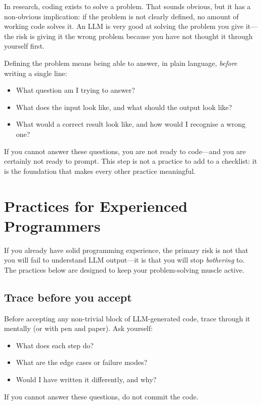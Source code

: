 \documentclass[12pt]{article}
\begin{document}
In research, coding exists to solve a problem. That sounds obvious, but it has a non-obvious implication: if the problem is not clearly defined, no amount of working code solves it. An LLM is very good at solving the problem you give it---the risk is giving it the wrong problem because you have not thought it through yourself first.

Defining the problem means being able to answer, in plain language, \emph{before} writing a single line:

\begin{itemize}
    \item What question am I trying to answer?
    \item What does the input look like, and what should the output look like?
    \item What would a correct result look like, and how would I recognise a wrong one?
\end{itemize}

\noindent If you cannot answer these questions, you are not ready to code---and you are certainly not ready to prompt.
This step is not a practice to add to a checklist: it is the foundation that makes every other practice meaningful.

\section{Practices for Experienced Programmers}

If you already have solid programming experience, the primary risk is not that you will fail to understand LLM output---it is that you will stop \emph{bothering} to.
The practices below are designed to keep your problem-solving muscle active.

\subsection{Trace before you accept}

Before accepting any non-trivial block of LLM-generated code, trace through it mentally (or with pen and paper). Ask yourself:
\begin{itemize}
    \item What does each step do?
    \item What are the edge cases or failure modes?
    \item Would I have written it differently, and why?
\end{itemize}
If you cannot answer these questions, do not commit the code.
\end{document}
